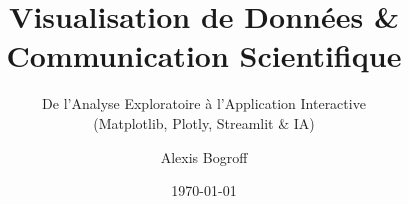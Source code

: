 
\title[Viz \& Streamlit]{Visualisation de Données \& Communication Scientifique}

\subtitle{De l'Analyse Exploratoire à l'Application Interactive\\(Matplotlib, Plotly, Streamlit \& IA)}

\author{Alexis Bogroff}


\date{\today}

